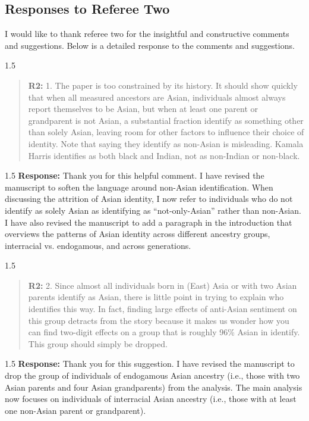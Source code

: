 \documentclass[12pt,english]{article}
\newcommand{\rrxspc}{1.5}
\begin{document}
\begin{refsection}
    \section{Responses to Referee Two}
    I would like to thank referee two for the insightful and constructive comments and suggestions. Below is a detailed response to the comments and suggestions.

    \begin{spacing}{\rrxspc}
            \begin{quotation}
                \textbf{R2: } 1. The paper is too constrained by its history. It should show quickly that when all measured ancestors are Asian, individuals almost always report themselves to be Asian, but when at least one parent or grandparent is not Asian, a substantial fraction identify as something other than solely Asian, leaving room for other factors to influence their choice of identity. Note that saying they identify as non-Asian is misleading. Kamala Harris identifies as both black and Indian, not as non-Indian or non-black.
            \end{quotation}
    \end{spacing}
    \begin{spacing}{\rrxspc}
        \textbf{Response:} Thank you for this helpful comment. I have revised the manuscript to soften the language around non-Asian identification. When discussing the attrition of Asian identity, I now refer to individuals who do not identify as solely Asian as identifying as ``not-only-Asian'' rather than non-Asian. I have also revised the manuscript to add a paragraph in the introduction that overviews the patterns of Asian identity across different ancestry groups, interracial vs. endogamous, and across generations. 
    \end{spacing}

    \begin{spacing}{\rrxspc}
            \begin{quotation}
                \textbf{R2: } 2. Since almost all individuals born in (East) Asia or with two Asian parents identify as Asian, there is little point in trying to explain who identifies this way. In fact, finding large effects of anti-Asian sentiment on this group detracts from the story because it makes us wonder how you can find two-digit effects on a group that is roughly 96\% Asian in identify. This group should simply be dropped.
            \end{quotation}
    \end{spacing}
    \begin{spacing}{\rrxspc}
        \textbf{Response:} Thank you for this suggestion. I have revised the manuscript to drop the group of individuals of endogamous Asian ancestry (i.e., those with two Asian parents and four Asian grandparents) from the analysis. The main analysis now focuses on individuals of interracial Asian ancestry (i.e., those with at least one non-Asian parent or grandparent).
    \end{spacing}


\end{refsection}
\end{document}
